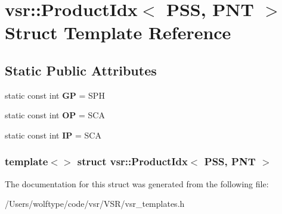 \hypertarget{structvsr_1_1_product_idx_3_01_p_s_s_00_01_p_n_t_01_4}{\section{vsr\-:\-:Product\-Idx$<$ P\-S\-S, P\-N\-T $>$ Struct Template Reference}
\label{structvsr_1_1_product_idx_3_01_p_s_s_00_01_p_n_t_01_4}
}
\subsection*{Static Public Attributes}
\begin{DoxyCompactItemize}
\item 
\hypertarget{structvsr_1_1_product_idx_3_01_p_s_s_00_01_p_n_t_01_4_ad4eb42b2a967bca25d23fd680b837b1f}{static const int {\bfseries G\-P} = S\-P\-H}\label{structvsr_1_1_product_idx_3_01_p_s_s_00_01_p_n_t_01_4_ad4eb42b2a967bca25d23fd680b837b1f}

\item 
\hypertarget{structvsr_1_1_product_idx_3_01_p_s_s_00_01_p_n_t_01_4_a06e39a5f24971db0be889ec02e22274d}{static const int {\bfseries O\-P} = S\-C\-A}\label{structvsr_1_1_product_idx_3_01_p_s_s_00_01_p_n_t_01_4_a06e39a5f24971db0be889ec02e22274d}

\item 
\hypertarget{structvsr_1_1_product_idx_3_01_p_s_s_00_01_p_n_t_01_4_a5140cd78f8883cdfa17a996fb0bb2e31}{static const int {\bfseries I\-P} = S\-C\-A}\label{structvsr_1_1_product_idx_3_01_p_s_s_00_01_p_n_t_01_4_a5140cd78f8883cdfa17a996fb0bb2e31}

\end{DoxyCompactItemize}
\subsubsection*{template$<$$>$ struct vsr\-::\-Product\-Idx$<$ P\-S\-S, P\-N\-T $>$}



The documentation for this struct was generated from the following file\-:\begin{DoxyCompactItemize}
\item 
/\-Users/wolftype/code/vsr/\-V\-S\-R/vsr\-\_\-templates.\-h\end{DoxyCompactItemize}
